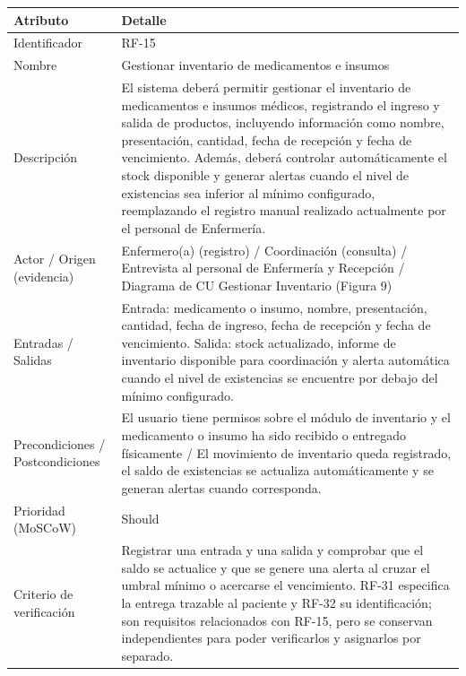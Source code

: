 \documentclass[11pt,a4paper]{article}
\begin{document}
	\begin{longtable}{p{} p{}}
		
		\toprule
		\textbf{Atributo} & \textbf{Detalle} \\
		\midrule
		\endhead
		
		Identificador &
		RF-15 \\
		
		Nombre &
		Gestionar inventario de medicamentos e insumos \\
		
		Descripción &
		El sistema deberá permitir gestionar el inventario de medicamentos e insumos médicos, registrando el ingreso y salida de productos, incluyendo información como nombre, presentación, cantidad, fecha de recepción y fecha de vencimiento. Además, deberá controlar automáticamente el stock disponible y generar alertas cuando el nivel de existencias sea inferior al mínimo configurado, reemplazando el registro manual realizado actualmente por el personal de Enfermería. \\
		
		Actor / Origen (evidencia) &
		Enfermero(a) (registro) / Coordinación (consulta) / Entrevista al personal de Enfermería y Recepción / Diagrama de CU Gestionar Inventario (Figura 9) \\
		
		Entradas / Salidas &
		Entrada: medicamento o insumo, nombre, presentación, cantidad, fecha de ingreso, fecha de recepción y fecha de vencimiento. Salida: stock actualizado, informe de inventario disponible para coordinación y alerta automática cuando el nivel de existencias se encuentre por debajo del mínimo configurado. \\
		
		Precondiciones / Postcondiciones &
		El usuario tiene permisos sobre el módulo de inventario y el medicamento o insumo ha sido recibido o entregado físicamente / El movimiento de inventario queda registrado, el saldo de existencias se actualiza automáticamente y se generan alertas cuando corresponda. \\
		
		Prioridad (MoSCoW) &
		Should \\
		
		Criterio de verificación &
		Registrar una entrada y una salida y comprobar que el saldo se actualice y que se genere una alerta al cruzar el umbral mínimo o acercarse el vencimiento. RF-31 especifica la entrega trazable al paciente y RF-32 su identificación; son requisitos relacionados con RF-15, pero se conservan independientes para poder verificarlos y asignarlos por separado. \\
		
		\bottomrule
	\end{longtable}
	
\end{document}
